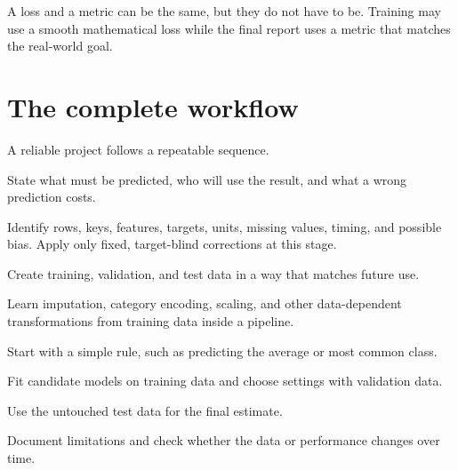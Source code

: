 A loss and a metric can be the same, but they do not have to be. Training may use a smooth mathematical loss while the final report uses a metric that matches the real-world goal.

\section{The complete workflow}

A reliable project follows a repeatable sequence.

\begin{mlfigure}
\end{mlfigure}

\begin{mlsteps}
  \item {} State what must be predicted, who will use the result, and what a wrong prediction costs.
  \item {} Identify rows, keys, features, targets, units, missing values, timing, and possible bias. Apply only fixed, target-blind corrections at this stage.
  \item {} Create training, validation, and test data in a way that matches future use.
  \item {} Learn imputation, category encoding, scaling, and other data-dependent transformations from training data inside a pipeline.
  \item {} Start with a simple rule, such as predicting the average or most common class.
  \item {} Fit candidate models on training data and choose settings with validation data.
  \item {} Use the untouched test data for the final estimate.
  \item {} Document limitations and check whether the data or performance changes over time.
\end{mlsteps}

